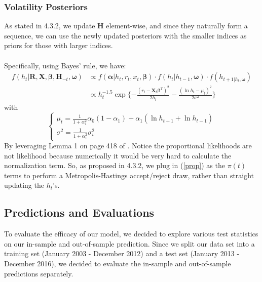\documentclass[letterpaper]{article}
\newcommand{\XX}{\mathbf{X}}
\begin{document}
	\subsubsection{Volatility Posteriors}
	As stated in 4.3.2, we update $\bm{H}$ element-wise, and since they naturally form a sequence, we can use the newly updated posteriors with the smaller indices as priors for those with larger indices.\\\\
	Specifically, using Bayes' rule, we have:
	\begin{equation}\label{prop}
	\begin{split}
	f(h_t|\bm{R},\bm{X},\bm{\beta},\bm{H}_{-t},\bm{\omega})
	&\propto f(\bm{\alpha}|h_t,r_t,x_t,\bm{\beta})\cdot f(h_t|h_{t-1},\bm{\omega})\cdot f(h_{t+1|h_t,\bm{\omega}})\\
	&\propto h_t^{-1.5}\exp\{-\frac{(r_t-\XX_t\bm{\beta}^T)^2}{2h_t}-\frac{(\ln h_t-\mu_t)^2}{2\sigma^2}\}
	\end{split}
	\end{equation}
	with
	\begin{equation}
	\begin{cases}
	\mu_t=\frac{1}{1+\alpha_{1}^2}\alpha_{0}(1-\alpha_{1})+\alpha_{1}(\ln h_{t+1}+\ln h_{t-1})\\
	\sigma^2=\frac{1}{1+\alpha_{1}^2}\sigma_{v}^2
	\end{cases}
	\end{equation}
	By leveraging Lemma 1 on page 418 of \cite{tiao1973post}. Notice the proportional likelihoods are not likelihood because numerically it would be very hard to calculate the normalization term. So, as proposed in 4.3.2, we plug in (\ref{prop}) as the $\pi(t)$ terms to perform a Metropolis-Hastings accept/reject draw, rather than straight updating the $h_t$'s.
	\subsection{Predictions and Evaluations}
	To evaluate the efficacy of our model, we decided to explore various test statistics on our in-sample and out-of-sample prediction. Since we split our data set into a training set (January 2003 - December 2012) and a test set (January 2013 - December 2016), we decided to evaluate the in-sample and out-of-sample predictions separately.
	
\end{document}
